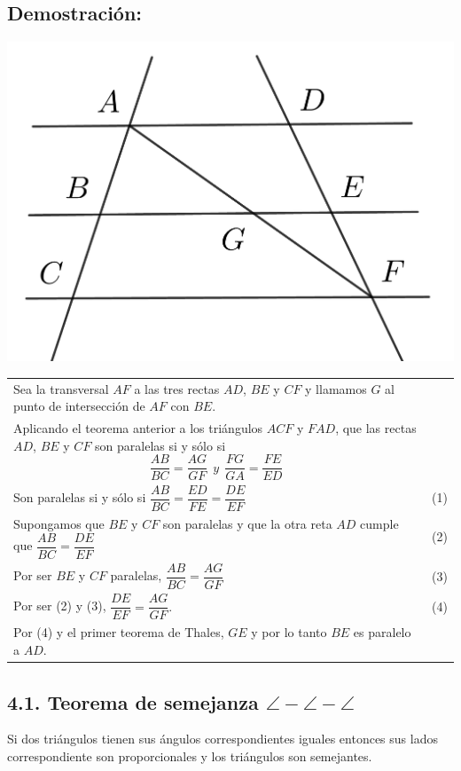 \documentclass[12pt,a4paper]{article}
\begin{document}
\subsection*{Demostración:}
\begin{center}
\includegraphics[scale=0.6]{Imagenes/thales2.png} 
\end{center}
\begin{tabular}{p{15.9cm} p{1cm}}
Sea la transversal $AF$ a las tres rectas $AD$, $BE$ y $CF$ y llamamos $G$ al punto de intersección de $AF$ con $BE$.
\\Aplicando el teorema anterior a los triángulos $ACF$ y $FAD$, que las rectas $AD$, $BE$ y $CF$ son paralelas si y sólo si
$$\dfrac{AB}{BC}=\dfrac{AG}{GF} \> \>  y \> \> \dfrac{FG}{GA}=\dfrac{FE}{ED}$$
\\Son paralelas si y sólo si $\dfrac{AB}{BC}=\dfrac{ED}{FE}=\dfrac{DE}{EF}$ & (1)
\\Supongamos que $BE$ y $CF$ son paralelas y que la otra reta $AD$ cumple que $\dfrac{AB}{BC}=\dfrac{DE}{EF}$ &(2)
\\ Por ser $BE$ y $CF$ paralelas, $\dfrac{AB}{BC}=\dfrac{AG}{GF}$&(3)
\\Por ser (2) y (3), $\dfrac{DE}{EF}=\dfrac{AG}{GF}.$ & (4)
\\Por (4) y el primer teorema de Thales, $GE$ y por lo tanto $BE$ es paralelo a $AD$. 
\end{tabular}
\subsection*{4.1. Teorema de semejanza $\angle - \angle - \angle$}
Si dos triángulos tienen sus ángulos correspondientes iguales entonces sus lados correspondiente son proporcionales y los triángulos son semejantes.
\end{document}
